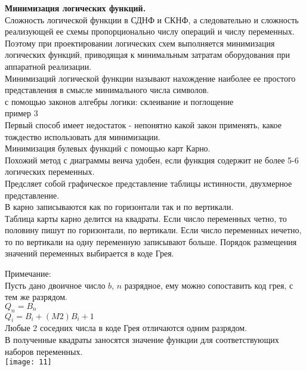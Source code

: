 \Large{ \textbf {Минимизация логических функций.}}\\
Сложность логической функции в СДНФ и СКНФ, а следовательно и сложность реализующей ее схемы пропорционально числу операций и числу переменных.
Поэтому при проектировании логических схем выполняется минимизация логических функций,
приводящая к минимальным затратам оборудования при аппаратной реализации.\\
Минимизаций логической функции называют нахождение наиболее ее простого представления в смысле минимального числа символов.\\
с помощью законов алгебры логики: склеивание и поглощение\\
пример 3\\
Первый способ имеет недостаток - непонятно какой закон применять, какое тождество использовать для минимизации.\\
Минимизация булевых функций с помощью карт Карно.\\
Похожий метод с диаграммы веича удобен, если функция содержит не более 5-6 логических переменных.\\
Предсляет собой графическое представление таблицы истинности, двухмерное представление.\\
В карно записываются как по горизонтали так и по вертикали.\\

Таблица карты карно делится на квадраты. Если число переменных четно,
то половину пишут по горизонтали, по вертикали. Если число переменных нечетно,
то по вертикали на одну переменную записывают больше.
Порядок размещения значений переменных выбирается в коде Грея.

Примечание:\\
Пусть дано двоичное число $b$, $n$ разрядное, ему можно сопоставить код грея, с тем же разрядом.\\
$Q_n = B_n$\\
$Q_i = B_i +(M2) B_i + 1$\\
Любые 2 соседних числа в коде Грея отличаются одним разрядом.\\
В полученные квадраты заносятся значение функции для соответствующих наборов переменных.\\
\texttt{[image: 11]}


